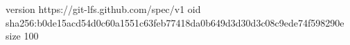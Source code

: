 version https://git-lfs.github.com/spec/v1
oid sha256:b0de15acd54d0c60a1551c63feb77418da0b649d3d30d3c08c9ede74f598290e
size 100
